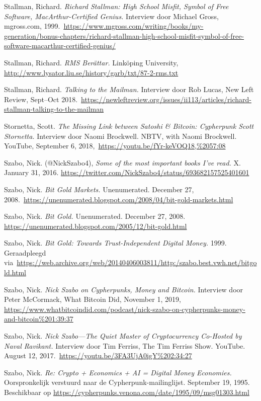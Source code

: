 \documentclass[
  a5paper,
  smalldemyvopaper,11pt,twoside,onecolumn,openright,extrafontsizes,
hidelinks]{memoir}
\begin{document}
Stallman, Richard. \emph{Richard Stallman: High School Misfit, Symbol of
Free Software, MacArthur-Certified Genius.} Interview door Michael
Gross, mgross.com,
1999.~\url{https://www.mgross.com/writing/books/my-generation/bonus-chapters/richard-stallman-high-school-misfit-symbol-of-free-software-macarthur-certified-genius/}

Stallman, Richard. \emph{RMS Berättar.} Linköping University,
\url{http://www.lysator.liu.se/history/garb/txt/87-2-rms.txt}

Stallman, Richard. \emph{Talking to the Mailman.} Interview door Rob
Lucas, New Left Review, Sept--Oct
2018.~\url{https://newleftreview.org/issues/ii113/articles/richard-stallman-talking-to-the-mailman}

Stornetta, Scott. \emph{The Missing Link between Satoshi \& Bitcoin:
Cypherpunk Scott Stornetta.} Interview door Naomi Brockwell. NBTV, with
Naomi Brockwell. YouTube, September 6,
2018,~\url{https://youtu.be/fYr-keVOQ18,\%2057:08}

Szabo, Nick. (@NickSzabo4), \emph{Some of the most important books I've
read.} X. January 31, 2016.
\url{https://twitter.com/NickSzabo4/status/693682157525401601}

Szabo, Nick. \emph{Bit Gold Markets.} Unenumerated. December 27,
2008.~\url{https://unenumerated.blogspot.com/2008/04/bit-gold-markets.html}

Szabo, Nick. \emph{Bit Gold.} Unenumerated. December 27, 2008.
\url{https://unenumerated.blogspot.com/2005/12/bit-gold.html}

Szabo, Nick. \emph{Bit Gold: Towards Trust-Independent Digital Money.}
1999. Geraadpleegd
via~\url{https://web.archive.org/web/20140406003811/http:/szabo.best.vwh.net/bitgold.html}

Szabo, Nick. \emph{Nick Szabo on Cypherpunks, Money and Bitcoin.}
Interview door Peter McCormack, What Bitcoin Did, November 1, 2019,
\url{https://www.whatbitcoindid.com/podcast/nick-szabo-on-cypherpunks-money-and-bitcoin\%201:39:37}

Szabo, Nick. \emph{Nick Szabo---The Quiet Master of Cryptocurrency
\textbar{} Co-Hosted by Naval Ravikant.} Interview door Tim Ferriss, The
Tim Ferriss Show. YouTube. August 12,
2017.~\url{https://youtu.be/3FA3UjA0igY\%202:34:27}

Szabo, Nick. \emph{Re: Crypto + Economics + AI = Digital Money
Economies.} Oorspronkelijk verstuurd naar de Cypherpunk-mailinglijst.
September 19, 1995. Beschikbaar op
\url{https://cypherpunks.venona.com/date/1995/09/msg01303.html}
\end{document}
